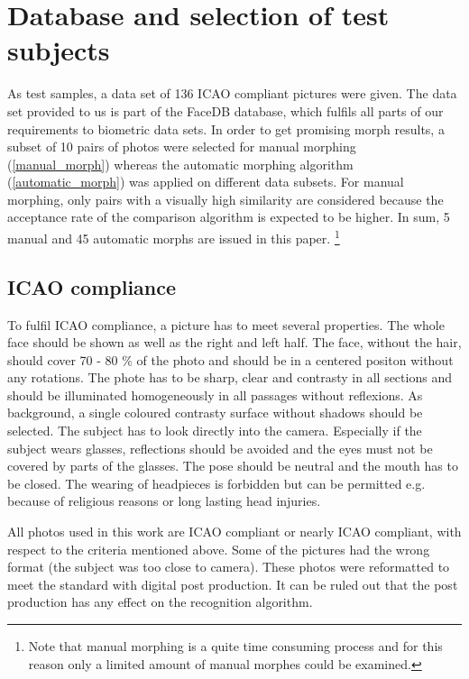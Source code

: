 \section{Database and selection of test subjects}
\label{Database}
As test samples, a data set of 136 ICAO compliant pictures were given. The data set provided to us is part of the FaceDB database, which  fulfils all parts of our requirements to biometric data sets. In order to get promising morph results, a subset of 10  pairs of photos were selected for manual morphing (\ref{manual_morph}) whereas the automatic morphing algorithm (\ref{automatic_morph}) was applied on different data subsets. For manual  morphing, only pairs with a visually high similarity are considered because the acceptance rate of the comparison algorithm is expected to be higher. 
In sum, 5 manual and 45 automatic morphs are issued in this paper. \footnote{Note that manual morphing is a quite time consuming process and for this reason only a limited amount of manual morphes could be examined.}





\subsection{ICAO compliance}
To fulfil ICAO compliance, a picture has to meet several properties. The whole face should be shown as well as the right and left half. The face, without the hair, should cover 70 - 80 \% of the photo and should be in a centered positon without any rotations. The phote has to be sharp, clear and contrasty in all sections and should be illuminated homogeneously in all passages without reflexions. As background, a single coloured contrasty surface without shadows should be selected. The subject has to look directly into the camera. Especially if the subject wears glasses, reflections should be avoided and the eyes must not be covered by parts of the glasses. The pose should be neutral and the mouth has to be closed. The wearing of headpieces is forbidden but can be permitted e.g. because of religious reasons or long lasting head injuries\cite{bdi2010Verordnung}. 

All photos used in this work are ICAO compliant or nearly ICAO compliant, with respect to the criteria mentioned above. Some of the pictures had the wrong format (the subject was too close to camera). These photos were reformatted to meet the standard with digital post production. It can be ruled out that the post production has any effect on the recognition algorithm. 

